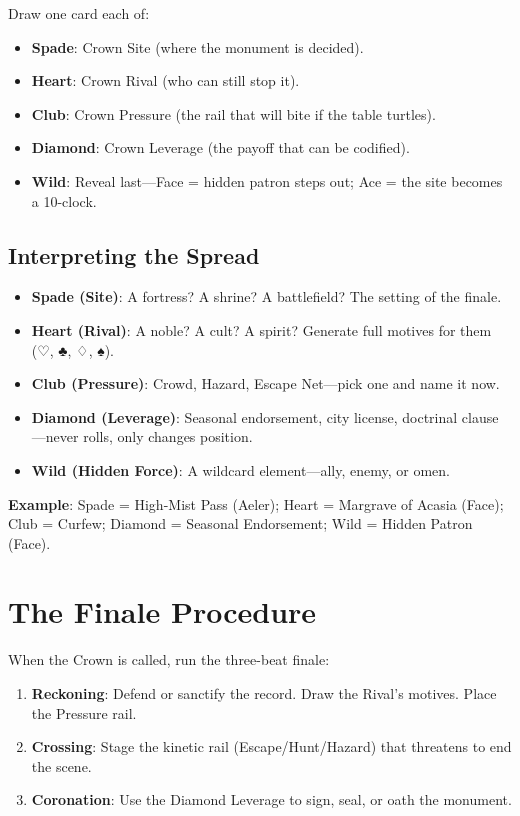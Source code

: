 Draw one card each of:

\begin{itemize}
    \item \textbf{Spade}: Crown Site (where the monument is decided).
    \item \textbf{Heart}: Crown Rival (who can still stop it).
    \item \textbf{Club}: Crown Pressure (the rail that will bite if the table turtles).
    \item \textbf{Diamond}: Crown Leverage (the payoff that can be codified).
    \item \textbf{Wild}: Reveal last—Face = hidden patron steps out; Ace = the site becomes a 10-clock.
\end{itemize}

\subsection*{Interpreting the Spread}

\begin{itemize}
    \item \textbf{Spade (Site)}: A fortress? A shrine? A battlefield? The setting of the finale.
    \item \textbf{Heart (Rival)}: A noble? A cult? A spirit? Generate full motives for them (♡, ♣, ♢, ♠).
    \item \textbf{Club (Pressure)}: Crowd, Hazard, Escape Net—pick one and name it now.
    \item \textbf{Diamond (Leverage)}: Seasonal endorsement, city license, doctrinal clause—never rolls, only changes position.
    \item \textbf{Wild (Hidden Force)}: A wildcard element—ally, enemy, or omen.
\end{itemize}

\textbf{Example}: Spade = High-Mist Pass (Aeler); Heart = Margrave of Acasia (Face); Club = Curfew; Diamond = Seasonal Endorsement; Wild = Hidden Patron (Face).

\section*{The Finale Procedure}

When the Crown is called, run the three-beat finale:

\begin{enumerate}
    \item \textbf{Reckoning}: Defend or sanctify the record. Draw the Rival’s motives. Place the Pressure rail.
    \item \textbf{Crossing}: Stage the kinetic rail (Escape/Hunt/Hazard) that threatens to end the scene.
    \item \textbf{Coronation}: Use the Diamond Leverage to sign, seal, or oath the monument.
\end{enumerate}

